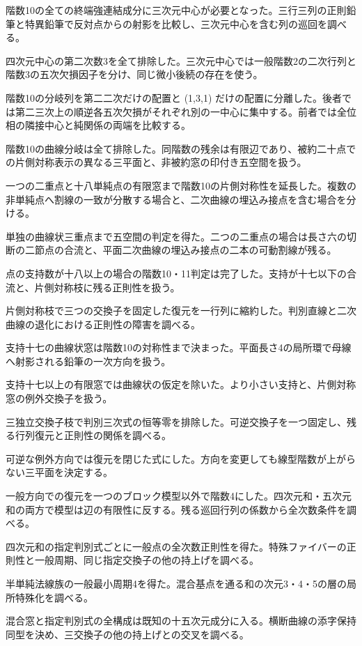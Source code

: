 \documentclass[11pt,a4paper]{ltjsarticle}
\begin{document}
階数10の全ての終端強連結成分に三次元中心が必要となった。三行三列の正則鉛筆と特異鉛筆で反対点からの射影を比較し、三次元中心を含む列の巡回を調べる。

四次元中心の第二次数3を全て排除した。三次元中心では一般階数2の二次行列と階数3の五次欠損因子を分け、同じ微小後続の存在を使う。

階数10の分岐列を第二二次だけの配置と (1,3,1) だけの配置に分離した。後者では第二三次上の順逆各五次欠損がそれぞれ別の一中心に集中する。前者では全位相の隣接中心と純関係の両端を比較する。

階数10の曲線分岐は全て排除した。同階数の残余は有限辺であり、被約二十点での片側対称表示の異なる三平面と、非被約窓の印付き五空間を扱う。

一つの二重点と十八単純点の有限窓まで階数10の片側対称性を延長した。複数の非単純点へ割線の一致が分散する場合と、二次曲線の埋込み接点を含む場合を分ける。

単独の曲線状三重点まで五空間の判定を得た。二つの二重点の場合は長さ六の切断の二節点の合流と、平面二次曲線の埋込み接点の二本の可動割線が残る。

点の支持数が十八以上の場合の階数10・11判定は完了した。支持が十七以下の合流と、片側対称枝に残る正則性を扱う。

片側対称枝で三つの交換子を固定した復元を一行列に縮約した。判別直線と二次曲線の退化における正則性の障害を調べる。

支持十七の曲線状窓は階数10の対称性まで決まった。平面長さ4の局所環で母線へ射影される鉛筆の一次方向を扱う。

支持十七以上の有限窓では曲線状の仮定を除いた。より小さい支持と、片側対称窓の例外交換子を扱う。

三独立交換子枝で判別三次式の恒等零を排除した。可逆交換子を一つ固定し、残る行列復元と正則性の関係を調べる。

可逆な例外方向では復元を閉じた式にした。方向を変更しても線型階数が上がらない三平面を決定する。

一般方向での復元を一つのブロック模型以外で階数4にした。四次元和・五次元和の両方で模型は辺の有限性に反する。残る巡回行列の係数から全次数条件を調べる。

四次元和の指定判別式ごとに一般点の全次数正則性を得た。特殊ファイバーの正則性と一般周期、同じ指定交換子の他の持上げを調べる。

半単純法線族の一般最小周期4を得た。混合基点を通る和の次元3・4・5の層の局所特殊化を調べる。

混合窓と指定判別式の全構成は既知の十五次元成分に入る。横断曲線の添字保持同型を決め、三交換子の他の持上げとの交叉を調べる。
\end{document}

